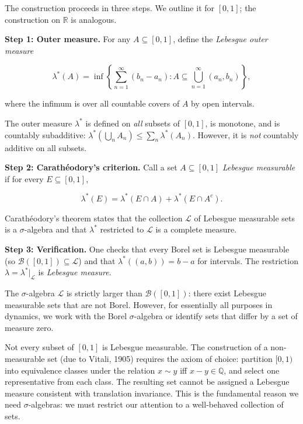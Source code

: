 The construction proceeds in three steps. We outline it for $[0,1]$; the construction on $\mathbb{R}$ is analogous.

\textbf{Step 1: Outer measure.} For any $A \subseteq [0,1]$, define the \textit{Lebesgue outer measure}

\[
\lambda^*(A) = \inf\!\left\{ \sum_{n=1}^{\infty} (b_n - a_n) : A \subseteq \bigcup_{n=1}^{\infty} (a_n, b_n) \right\},
\]

where the infimum is over all countable covers of $A$ by open intervals.

The outer measure $\lambda^*$ is defined on \textit{all} subsets of $[0,1]$, is monotone, and is countably subadditive: $\lambda^*(\bigcup_n A_n) \leq \sum_n \lambda^*(A_n)$. However, it is \textit{not} countably additive on all subsets.

\textbf{Step 2: Carath\'{e}odory's criterion.} Call a set $A \subseteq [0,1]$ \textit{Lebesgue measurable} if for every $E \subseteq [0,1]$,

\[
\lambda^*(E) = \lambda^*(E \cap A) + \lambda^*(E \cap A^c).
\]

Carath\'{e}odory's theorem states that the collection $\mathcal{L}$ of Lebesgue measurable sets is a $\sigma$-algebra and that $\lambda^*$ restricted to $\mathcal{L}$ is a complete measure.

\textbf{Step 3: Verification.} One checks that every Borel set is Lebesgue measurable (so $\mathcal{B}([0,1]) \subseteq \mathcal{L}$) and that $\lambda^*((a,b)) = b - a$ for intervals. The restriction $\lambda = \lambda^*|_{\mathcal{L}}$ is \textit{Lebesgue measure}.

The $\sigma$-algebra $\mathcal{L}$ is strictly larger than $\mathcal{B}([0,1])$: there exist Lebesgue measurable sets that are not Borel. However, for essentially all purposes in dynamics, we work with the Borel $\sigma$-algebra or identify sets that differ by a set of measure zero.

\begin{remark}
Not every subset of $[0,1]$ is Lebesgue measurable. The construction of a non-measurable set (due to Vitali, 1905) requires the axiom of choice: partition $[0,1)$ into equivalence classes under the relation $x \sim y$ iff $x - y \in \mathbb{Q}$, and select one representative from each class. The resulting set cannot be assigned a Lebesgue measure consistent with translation invariance. This is the fundamental reason we need $\sigma$-algebras: we must restrict our attention to a well-behaved collection of sets.
\end{remark}


